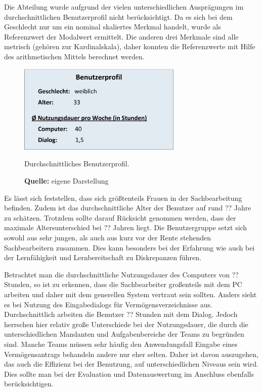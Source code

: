 Die Abteilung wurde aufgrund der vielen unterschiedlichen Ausprägungen im durchschnittlichen Benutzerprofil nicht berücksichtigt. Da es sich bei dem Geschlecht nur um ein nominal skaliertes Merkmal handelt, wurde als Referenzwert der Modalwert ermittelt. Die anderen drei Merkmale sind alle metrisch (gehören zur Kardinalskala), daher konnten die Referenzwerte mit Hilfe des arithmetischen Mittels berechnet werden.
\begin{figure}[H]
  \centering
  \includegraphics[width=295px]{img/durchschnittliches_Benutzerprofil.png}
  \caption{Durchschnittliches Benutzerprofil.}
  \caption*{\textbf{Quelle:} eigene Darstellung}
  \label{fig:durchschnittlichesBenutzerprofil}
\end{figure}
Es lässt sich feststellen, dass sich größtenteils Frauen in der Sachbearbeitung befinden. Zudem ist das durchschnittliche Alter der Benutzer auf rund ?? Jahre zu schätzen. Trotzdem sollte darauf Rücksicht genommen werden, dass der maximale Altersunterschied bei ?? Jahren liegt. Die Benutzergruppe setzt sich sowohl aus sehr jungen, als auch aus kurz vor der Rente stehenden Sachbearbeitern zusammen. Dies kann besonders bei der Erfahrung wie auch bei der Lernfähigkeit und Lernbereitschaft zu Diskrepanzen führen.

Betrachtet man die durchschnittliche Nutzungsdauer des Computers von ?? Stunden, so ist zu erkennen, dass die Sachbearbeiter großenteils mit dem PC arbeiten und daher mit dem generellen System vertraut sein sollten. Anders sieht es bei Nutzung des Eingabedialogs für Vermögensverzeichnisse aus. Durchschnittlich arbeiten die Benutzer ?? Stunden mit dem Dialog. Jedoch herrschen hier relativ große Unterschiede bei der Nutzungsdauer, die durch die unterschiedlichen Mandanten und Aufgabenbereiche der Teams zu begründen sind. Manche Teams müssen sehr häufig den Anwendungsfall \glqq Eingabe eines Vermögensantrags\grqq{} behandeln andere nur eher selten. Daher ist davon auszugehen, das auch die Effizienz bei der Benutzung, auf unterschiedlichen Niveaus sein wird. Dies sollte man bei der Evaluation und Datenauswertung im Anschluss ebenfalls berücksichtigen.


